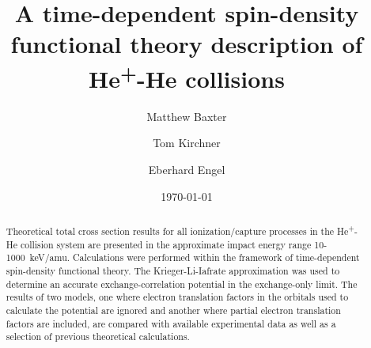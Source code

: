 \documentclass[aps, pra, reprint, groupedaddress, amsfonts, longbibliography,
               amsmath, amssymb, showpacs, nofootinbib]{revtex4-1}
\begin{document}
\title{A time-dependent spin-density functional theory description of He\textsuperscript{+}-He
       collisions}
\author{Matthew Baxter}
\author{Tom Kirchner}
\author{Eberhard Engel}
\date{\today}

\begin{abstract}

   Theoretical total cross section results for all ionization/capture processes in the
   He\textsuperscript{+}-He collision system are presented in the approximate impact energy range
   10-1000~keV/amu. Calculations were performed within the framework of time-dependent spin-density
   functional theory. The Krieger-Li-Iafrate approximation was used to determine an accurate 
   exchange-correlation potential in the exchange-only limit. The results of two models, one where
   electron translation factors in the orbitals used to calculate the potential are ignored and another
   where partial electron translation factors are included, are compared with available experimental
   data as well as a selection of previous theoretical calculations.

\end{abstract}

\maketitle
\end{document}
